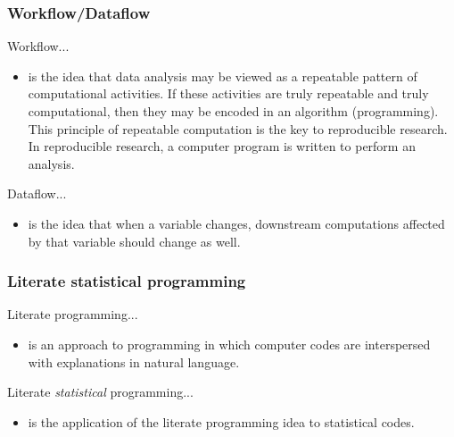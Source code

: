 \documentclass[10pt]{beamer}
\theoremstyle{exercise}
\begin{document}
\begin{frame}[fragile]
  \frametitle{Workflow/Dataflow}
  
{\Large Workflow...}

\vspace{3mm}
  
\begin{itemize}
  \item is the idea that data analysis may be viewed as a repeatable pattern of computational activities. If these activities are truly repeatable and truly computational, then they may be encoded in an algorithm (programming). This principle of repeatable computation is the key to reproducible research. In reproducible research, a computer program is written to perform an analysis.
\end{itemize}

\vspace{10mm}

{\Large Dataflow...}

\vspace{3mm}
  
\begin{itemize}
  \item is the idea that when a variable changes, downstream computations affected by that variable should change as well.
\end{itemize}

\end{frame}

\begin{frame}[fragile]
  \frametitle{Literate statistical programming}
  
{\Large Literate programming...}

\vspace{3mm}
  
\begin{itemize}
  \item is an approach to programming in which computer codes are interspersed with explanations in natural language.
\end{itemize}

\vspace{10mm}

{\Large Literate \textit{statistical} programming...}

\vspace{3mm}
  
\begin{itemize}
  \item is the application of the literate programming idea to statistical codes.
\end{itemize}

\end{frame}
\end{document}

